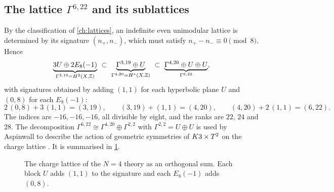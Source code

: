 \subsection{The lattice \texorpdfstring{$\Gamma^{6,22}$}{Gamma(6,22)} and its sublattices}
By the classification of \cref{ch:lattices}, an indefinite even unimodular lattice is determined
by its signature $(n_+,n_-)$, which must satisfy $n_+-n_-\equiv0\pmod 8$. Hence
\begin{equation}\label{eq:k3t2:tower}
 \underbrace{3U\oplus2E_8(-1)}_{\Gamma^{3,19}=H^2(X,\mathbb{Z})}\ \subset\
 \underbrace{\Gamma^{3,19}\oplus U}_{\Gamma^{4,20}=H^*(X,\mathbb{Z})}\ \subset\
 \underbrace{\Gamma^{4,20}\oplus U\oplus U}_{\Gamma^{6,22}},
\end{equation}
with signatures obtained by adding $(1,1)$ for each hyperbolic plane
$U$ and $(0,8)$ for each $E_8(-1)$:
\begin{equation}\label{eq:k3t2:sig}
 2\,(0,8)+3\,(1,1)=(3,19),\qquad (3,19)+(1,1)=(4,20),\qquad (4,20)+2\,(1,1)=(6,22).
\end{equation}
The indices are $-16,-16,-16$, all divisible by eight, and the ranks are $22$, $24$ and $28$.
The decomposition $\Gamma^{6,22}\cong\Gamma^{4,20}\oplus\Gamma^{2,2}$ with
$\Gamma^{2,2}=U\oplus U$ is used by Aspinwall to describe the action of geometric symmetries
of $K3\times T^2$ on the charge lattice \source{Asp §5.2, ll.~2898--2906}. It is summarised in
\cref{fig:k3t2:tower}.

\begin{figure}[b]
\centering
{}
\caption{The charge lattice of the $N=4$ theory as an orthogonal sum. Each block $U$ adds
$(1,1)$ to the signature and each $E_8(-1)$ adds $(0,8)$.}
\label{fig:k3t2:tower}
\end{figure}

